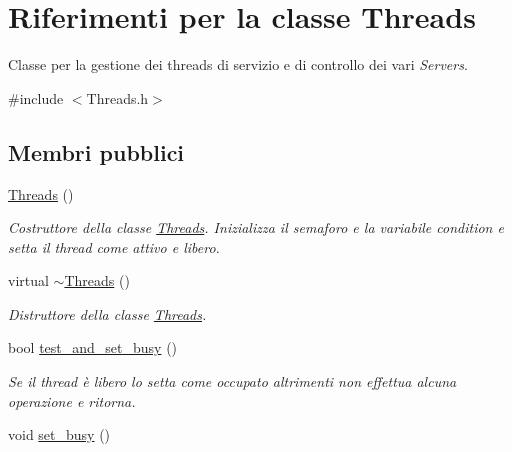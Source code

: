\hypertarget{class_threads}{\section{Riferimenti per la classe Threads}
\label{class_threads}
}


Classe per la gestione dei threads di servizio e di controllo dei vari {\itshape Servers}.  




{\ttfamily \#include $<$Threads.\-h$>$}

\subsection*{Membri pubblici}
\begin{DoxyCompactItemize}
\item 
\hypertarget{class_threads_af2a22bb9473d2300df0797d0aa07e4bf}{\hyperlink{class_threads_af2a22bb9473d2300df0797d0aa07e4bf}{Threads} ()}\label{class_threads_af2a22bb9473d2300df0797d0aa07e4bf}

\begin{DoxyCompactList}\small\item\em Costruttore della classe \hyperlink{class_threads}{Threads}. Inizializza il semaforo e la variabile condition e setta il thread come attivo e libero. \end{DoxyCompactList}\item 
\hypertarget{class_threads_a2b4399a2f8fc2b507f118c27fba9eca4}{virtual \hyperlink{class_threads_a2b4399a2f8fc2b507f118c27fba9eca4}{$\sim$\-Threads} ()}\label{class_threads_a2b4399a2f8fc2b507f118c27fba9eca4}

\begin{DoxyCompactList}\small\item\em Distruttore della classe \hyperlink{class_threads}{Threads}. \end{DoxyCompactList}\item 
bool \hyperlink{class_threads_a46da5f5ed9ee3711f566dc6c4f608dd8}{test\-\_\-and\-\_\-set\-\_\-busy} ()
\begin{DoxyCompactList}\small\item\em Se il {\itshape thread} è libero lo setta come occupato altrimenti non effettua alcuna operazione e ritorna. \end{DoxyCompactList}\item 
\hypertarget{class_threads_a507afb25cd6e8b044e02150f57b43a85}{void \hyperlink{class_threads_a507afb25cd6e8b044e02150f57b43a85}{set\-\_\-busy} ()}\label{class_threads_a507afb25cd6e8b044e02150f57b43a85}


\end{DoxyCompactItemize}
